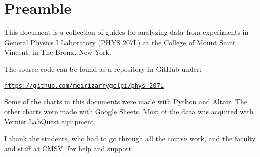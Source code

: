 \chapter*{Preamble}
%
This document is a collection of guides for analyzing data from experiments in General Physics I Laboratory (PHYS 207L) at the College of Mount Saint Vincent, in The Bronx, New York.

The source code can be found as a repository in GitHub under:
\begin{center}
    \href{https://github.com/meirizarrygelpi/phys-207L}{\texttt{https://github.com/meirizarrygelpi/phys-207L}}
\end{center}
Some of the charts in this documents were made with Python and Altair. The other charts were made with Google Sheets. Most of the data was acquired with Vernier LabQuest equipment.

I thank the students, who had to go through all the course work, and the faculty and staff at CMSV, for help and support.